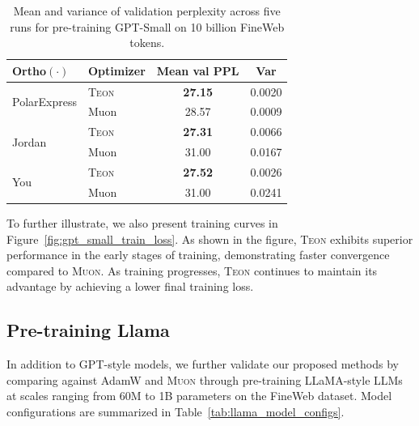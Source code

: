 \documentclass{article}
\theoremstyle{plain}
\theoremstyle{definition}
\theoremstyle{remark}
\begin{document}
\begin{table}[t]
\centering
\footnotesize
\setlength{\tabcolsep}{4pt}
\begin{tabular}{llcc}
\toprule
\textbf{Ortho$(\cdot)$} & \textbf{Optimizer} & \textbf{Mean val PPL} & \textbf{Var} \\
\midrule
\multirow{2}{*}{PolarExpress}
& \textsc{Teon} & \textbf{27.15} & 0.0020 \\
& Muon & 28.57 & 0.0009 \\
\midrule
\multirow{2}{*}{Jordan}
& \textsc{Teon} & \textbf{27.31} & 0.0066 \\
& Muon & 31.00 & 0.0167 \\
\midrule
\multirow{2}{*}{You}
& \textsc{Teon} & \textbf{27.52} & 0.0026 \\
& Muon & 31.00 & 0.0241 \\
\bottomrule
\end{tabular}
\caption{Mean and variance of validation perplexity across five runs for pre-training GPT-Small on 10 billion FineWeb tokens.}
\label{tab:gpt_small_var}
\vspace{-10pt}
\end{table}

To further illustrate, we also present training curves in Figure~\ref{fig:gpt_small_train_loss}. As shown in the figure, \textsc{Teon} exhibits superior performance in the early stages of training, demonstrating faster convergence compared to \textsc{Muon}. As training progresses, \textsc{Teon} continues to maintain its advantage by achieving a lower final training loss.

\subsection{Pre-training Llama}
In addition to GPT-style models, we further validate our proposed methods by comparing against AdamW and \textsc{Muon} through pre-training LLaMA-style LLMs at scales ranging from 60M to 1B parameters on the FineWeb dataset. 
Model configurations are summarized in Table~\ref{tab:llama_model_configs}. 
\end{document}
